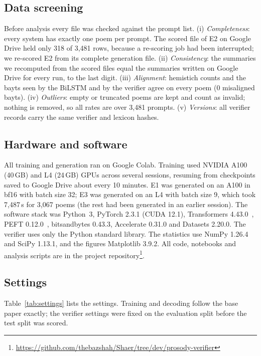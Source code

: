 \subsection{Data screening}
Before analysis every file was checked against the prompt list.
(i) \emph{Completeness}: every system has exactly one poem per prompt. The scored file of E2 on Google Drive held only
318 of 3,481 rows, because a re-scoring job had been interrupted; we re-scored E2 from its complete generation file.
(ii) \emph{Consistency}: the summaries we recomputed from the scored files equal the summaries written on Google Drive
for every run, to the last digit.
(iii) \emph{Alignment}: hemistich counts and the bayts seen by the BiLSTM and by the verifier agree on every poem
(0 misaligned bayts).
(iv) \emph{Outliers}: empty or truncated poems are kept and count as invalid; nothing is removed, so all rates are over
3,481 prompts.
(v) \emph{Versions}: all verifier records carry the same verifier and lexicon hashes.

\subsection{Hardware and software}
All training and generation ran on Google Colab. Training used NVIDIA A100 (40\,GB) and L4 (24\,GB) GPUs across
several sessions, resuming from checkpoints saved to Google Drive about every 10 minutes. E1 was generated on an A100
in bf16 with batch size 32; E3 was generated on an L4 with batch size 9, which took 7,487\,s for 3,067 poems (the rest
had been generated in an earlier session). The software stack was Python~3, PyTorch 2.3.1 (CUDA 12.1), Transformers
4.43.0~\cite{wolf2020transformers}, PEFT 0.12.0~\cite{mangrulkar2022peft}, bitsandbytes 0.43.3, Accelerate 0.31.0 and
Datasets 2.20.0. The verifier uses only the Python standard library. The statistics use NumPy 1.26.4 and SciPy 1.13.1,
and the figures Matplotlib 3.9.2. All code, notebooks and analysis scripts are in the project
repository\footnote{\url{https://github.com/thebazshah/Shaer/tree/dev/prosody-verifier}}.

\subsection{Settings}
Table~\ref{tab:settings} lists the settings. Training and decoding follow the base paper exactly; the verifier settings
were fixed on the evaluation split before the test split was scored.

